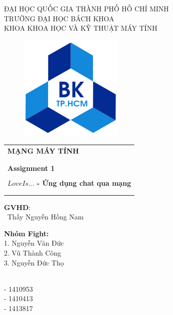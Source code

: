 \documentclass[10pt]{article}
\begin{document}
	
	\begin{titlepage}
		\begin{center}
			ĐẠI HỌC QUỐC GIA THÀNH PHỐ HỒ CHÍ MINH \\
			TRƯỜNG ĐẠI HỌC BÁCH KHOA \\
			KHOA KHOA HỌC VÀ KỸ THUẬT MÁY TÍNH 
		\end{center}
		
		\vspace{0.7cm}
		
		\begin{figure}[h!]
		\begin{center}
		\includegraphics[width=5cm]{hcmut.png}
		\end{center}
		\end{figure}
		
		\vspace{0.3cm}		
		
		\begin{center}
			\begin{tabular}{c}
				\multicolumn{1}{l}{\textbf{{\Large MẠNG MÁY TÍNH}}}\\
				\\
				\hline
				\\
				\multicolumn{1}{l}{\textbf{{\Large Assignment 1}}}\\
				\\
				\textbf{{\Huge $Love Is...$ - Ứng dụng chat qua mạng}}\\
				\\
				\hline
				\\
			\end{tabular}
		\end{center}
		
		\vspace{1.7cm}
		
		\begin{minipage}[t]{0.550\linewidth}
			\textbf{GVHD}: \\
			\ Thầy Nguyễn Hồng Nam
		\end{minipage}
		\begin{minipage}[t]{0.3\linewidth}
			\textbf{Nhóm Fight:}\\
			1. Nguyễn Văn Đức\\
			2. Vũ Thành Công\\
			3. Nguyễn Đức Thọ\\
		\end{minipage}
		\begin{minipage}[t]{0.20\linewidth}
			\textbf{}\\
			- 1410953\\
			- 1410413\\
			- 1413817
		\end{minipage}
		

\end{titlepage}
\end{document}
